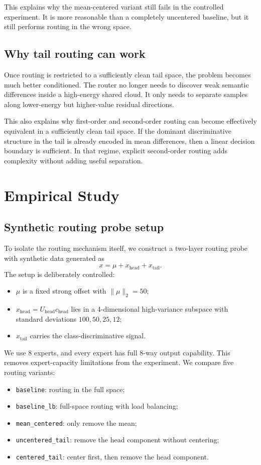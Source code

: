 \documentclass[11pt]{article}
\begin{document}
This explains why the mean-centered variant still fails in the controlled experiment. It is more reasonable than a completely uncentered baseline, but it still performs routing in the wrong space.

\subsection{Why tail routing can work}

Once routing is restricted to a sufficiently clean tail space, the problem becomes much better conditioned. The router no longer needs to discover weak semantic differences inside a high-energy shared cloud. It only needs to separate samples along lower-energy but higher-value residual directions.

This also explains why first-order and second-order routing can become effectively equivalent in a sufficiently clean tail space. If the dominant discriminative structure in the tail is already encoded in mean differences, then a linear decision boundary is sufficient. In that regime, explicit second-order routing adds complexity without adding useful separation.

\section{Empirical Study}

\subsection{Synthetic routing probe setup}

To isolate the routing mechanism itself, we construct a two-layer routing probe with synthetic data generated as
\[
x = \mu + x_{\mathrm{head}} + x_{\mathrm{tail}}.
\]
The setup is deliberately controlled:
\begin{itemize}
    \item $\mu$ is a fixed strong offset with $\|\mu\|_2 = 50$;
    \item $x_{\mathrm{head}} = U_{\mathrm{head}} c_{\mathrm{head}}$ lies in a 4-dimensional high-variance subspace with standard deviations $100, 50, 25, 12$;
    \item $x_{\mathrm{tail}}$ carries the class-discriminative signal.
\end{itemize}

We use 8 experts, and every expert has full 8-way output capability. This removes expert-capacity limitations from the experiment. We compare five routing variants:
\begin{itemize}
    \item \texttt{baseline}: routing in the full space;
    \item \texttt{baseline\_lb}: full-space routing with load balancing;
    \item \texttt{mean\_centered}: only remove the mean;
    \item \texttt{uncentered\_tail}: remove the head component without centering;
    \item \texttt{centered\_tail}: center first, then remove the head component.
\end{itemize}
\end{document}
